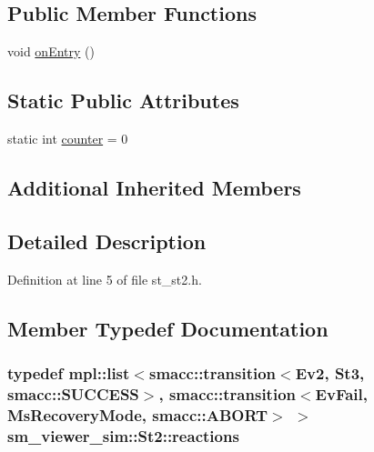 \subsection*{Public Member Functions}
\begin{DoxyCompactItemize}
\item 
void \hyperlink{structsm__viewer__sim_1_1St2_af71699583a65b935221621956c6900da}{on\+Entry} ()
\end{DoxyCompactItemize}
\subsection*{Static Public Attributes}
\begin{DoxyCompactItemize}
\item 
static int \hyperlink{structsm__viewer__sim_1_1St2_ab488bf5ee92dbf4652b5b01830b37849}{counter} = 0
\end{DoxyCompactItemize}
\subsection*{Additional Inherited Members}


\subsection{Detailed Description}


Definition at line 5 of file st\+\_\+st2.\+h.



\subsection{Member Typedef Documentation}
\subsubsection[{\texorpdfstring{reactions}{reactions}}]{\setlength{\rightskip}{0pt plus 5cm}typedef mpl\+::list$<${\bf smacc\+::transition}$<${\bf Ev2}, {\bf St3}, {\bf smacc\+::\+S\+U\+C\+C\+E\+SS}$>$, {\bf smacc\+::transition}$<${\bf Ev\+Fail}, {\bf Ms\+Recovery\+Mode}, {\bf smacc\+::\+A\+B\+O\+RT}$>$ $>$ {\bf sm\+\_\+viewer\+\_\+sim\+::\+St2\+::reactions}}\hypertarget{structsm__viewer__sim_1_1St2_adef5108438c9d8891229f9d247bd5995}{}\label{structsm__viewer__sim_1_1St2_adef5108438c9d8891229f9d247bd5995}


